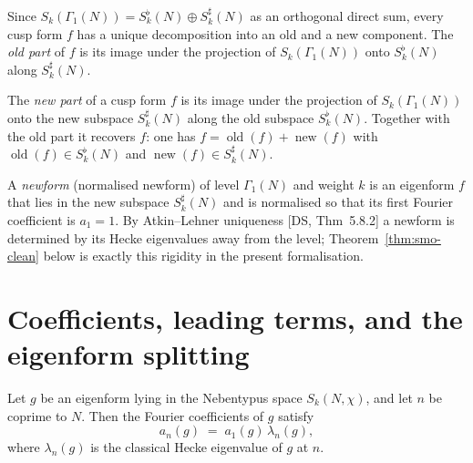 \begin{definition}\label{def:oldPart}
\leanok
Since $S_k(\Gamma_1(N))=S_k^{\flat}(N)\oplus S_k^{\sharp}(N)$ as an orthogonal direct sum, every cusp form
$f$ has a unique decomposition into an old and a new component. The \emph{old part} of $f$ is its image
under the projection of $S_k(\Gamma_1(N))$ onto $S_k^{\flat}(N)$ along $S_k^{\sharp}(N)$.
\end{definition}

\begin{definition}\label{def:newPart}
\leanok
The \emph{new part} of a cusp form $f$ is its image under the projection of $S_k(\Gamma_1(N))$ onto the
new subspace $S_k^{\sharp}(N)$ along the old subspace $S_k^{\flat}(N)$. Together with the old part it
recovers $f$: one has $f=\operatorname{old}(f)+\operatorname{new}(f)$ with $\operatorname{old}(f)\in S_k^{\flat}(N)$
and $\operatorname{new}(f)\in S_k^{\sharp}(N)$.
\end{definition}

\begin{definition}[Newform]\label{def:newform}
\leanok
A \emph{newform} (normalised newform) of level $\Gamma_1(N)$ and weight $k$ is an eigenform $f$ that lies
in the new subspace $S_k^{\sharp}(N)$ and is normalised so that its first Fourier coefficient is $a_1=1$.
By Atkin--Lehner uniqueness [DS, Thm~5.8.2] a newform is determined by its Hecke eigenvalues away from the
level; Theorem~\ref{thm:smo-clean} below is exactly this rigidity in the present formalisation.
\end{definition}

\section{Coefficients, leading terms, and the eigenform splitting}

\begin{theorem}[Miyake 4.5.15(1): $a_n=a_1\lambda_n$]\label{thm:coeff-eq-a1-lambda}
\leanok
Let $g$ be an eigenform lying in the Nebentypus space $S_k(N,\chi)$, and let $n$ be coprime to $N$. Then
the Fourier coefficients of $g$ satisfy
\[
  a_n(g) \;=\; a_1(g)\,\lambda_n(g),
\]
where $\lambda_n(g)$ is the classical Hecke eigenvalue of $g$ at $n$.
\end{theorem}

